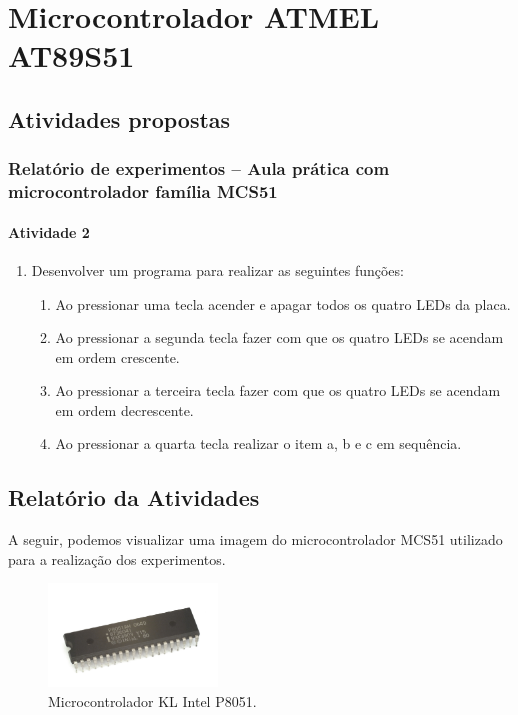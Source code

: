 \documentclass[
	12pt,				%
	openright,			%
  oneside,     %
	a4paper,			%
	english,			%
	french,				%
	spanish,			%
	brazil				%
	]{abntex2}
\begin{document}
\chapter{Microcontrolador ATMEL AT89S51}%
\label{cha:2-ATMEL-AT89S51}

\section{Atividades propostas} %
\label{sec:atividades_propostas-AT89S51}

\subsection*{Relatório de experimentos – Aula prática com microcontrolador família MCS51}

\subsubsection*{Atividade 2}

\begin{enumerate}
\item Desenvolver um programa para realizar as seguintes funções:
\begin{enumerate}
\item Ao pressionar uma tecla acender e apagar todos os quatro LEDs da placa.
\item Ao pressionar a segunda tecla fazer com que os quatro LEDs se acendam em ordem crescente.
\item Ao pressionar a terceira tecla fazer com que os quatro LEDs se acendam em ordem decrescente.
\item Ao pressionar a quarta tecla realizar o item a, b e c em sequência.
\end{enumerate}
\end{enumerate}


\section{Relatório da Atividades} %
\label{sec:Consideracoes-AT89S51}

A seguir, podemos visualizar uma imagem do microcontrolador MCS51 utilizado para a realização dos experimentos.

\begin{figure}[ht]
  \centering
  \caption{\label{fig:Microcontrolador-KL-Intel-P8051}Microcontrolador KL Intel P8051.}  
  \includegraphics[width=0.4\textwidth]{images/Atividade02/Atividade-02-03-Microcontrolador-KL_Intel_P8051.jpg}
\end{figure}
\end{document}

